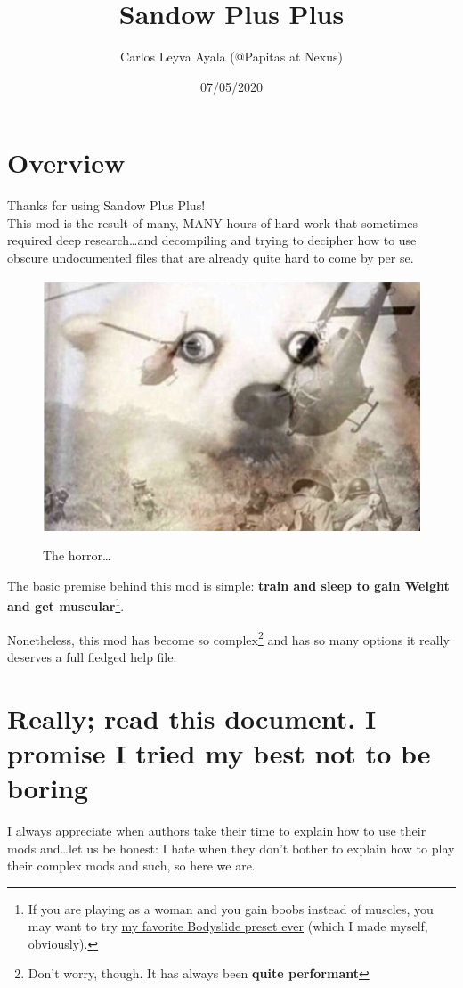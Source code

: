\documentclass[11pt]{article}
\title{Sandow Plus Plus}
\author{Carlos Leyva Ayala (@Papitas at Nexus)}
\date{07/05/2020}
\newcommand{\bold}[1]{\textbf{#1}}
\newcommand{\w}{Weight}
\newlength{\imgMed}
\begin{document}
\maketitle

\tableofcontents
\pagebreak

\section{Overview}
Thanks for using Sandow Plus Plus! \\
This mod is the result of many, MANY hours of hard work that sometimes required deep research\ldots and decompiling and trying to decipher how to use obscure  undocumented files that are already quite hard to come by per se.

\begin{figure}[H]
    \centering
    \includegraphics[width=\imgMed]{flashback}
    \label{fig:flashback}
    \caption{The horror\ldots}
\end{figure}

The basic premise behind this mod is simple: \bold{train and sleep to gain \w{} and get muscular}\footnote{If you are playing as a woman and you gain boobs instead of muscles, you may want to try \href{https://www.nexusmods.com/skyrimspecialedition/mods/34593}{my favorite Bodyslide preset ever} (which I made myself, obviously).}. 

Nonetheless, this mod has become so complex\footnote{Don't worry, though. It has always been \bold{quite performant}} and has so many options it really deserves a full fledged help file.

\section{Really; read this document. I promise I tried my best not to be boring}
I always appreciate when authors take their time to explain how to use their mods and\ldots let us be honest: I hate when they don't bother to explain how to play their complex mods and such, so here we are.
\end{document}
